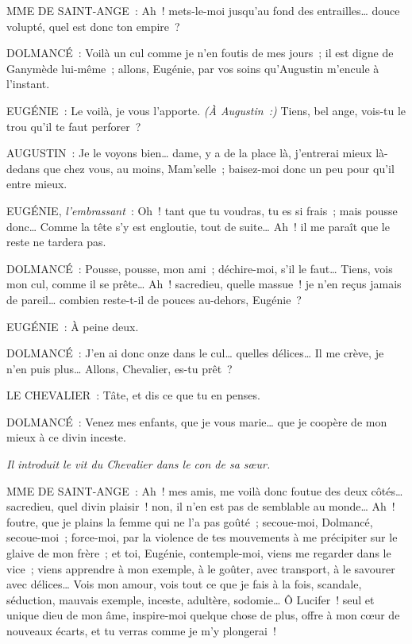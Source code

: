 \documentclass[french,twoside]{book} %
\begin{document}
MME DE SAINT-ANGE : Ah ! mets-le-moi jusqu’au fond des entrailles… douce volupté, quel est donc ton empire ?\par
DOLMANCÉ : Voilà un cul comme je n’en foutis de mes jours ; il est digne de Ganymède lui-même ; allons, Eugénie, par vos soins qu’Augustin m’encule à l’instant.\par
EUGÉNIE : Le voilà, je vous l’apporte. {\itshape (À Augustin :)} Tiens, bel ange, vois-tu le trou qu’il te faut perforer ?\par
AUGUSTIN : Je le voyons bien… dame, y a de la place là, j’entrerai mieux là-dedans que chez vous, au moins, Mam’selle ; baisez-moi donc un peu pour qu’il entre mieux.\par
EUGÉNIE, {\itshape l’embrassant} : Oh ! tant que tu voudras, tu es si frais ; mais pousse donc… Comme la tête s’y est engloutie, tout de suite… Ah ! il me paraît que le reste ne tardera pas.\par
DOLMANCÉ : Pousse, pousse, mon ami ; déchire-moi, s’il le faut… Tiens, vois mon cul, comme il se prête… Ah ! sacredieu, quelle massue ! je n’en reçus jamais de pareil… combien reste-t-il de pouces au-dehors, Eugénie ?\par
EUGÉNIE : À peine deux.\par
DOLMANCÉ : J’en ai donc onze dans le cul… quelles délices… Il me crève, je n’en puis plus… Allons, Chevalier, es-tu prêt ?\par
LE CHEVALIER : Tâte, et dis ce que tu en penses.\par
DOLMANCÉ : Venez mes enfants, que je vous marie… que je coopère de mon mieux à ce divin inceste.\par
{\itshape Il introduit le vit du Chevalier dans le con de sa sœur.}\par
MME DE SAINT-ANGE : Ah ! mes amis, me voilà donc foutue des deux côtés… sacredieu, quel divin plaisir ! non, il n’en est pas de semblable au monde… Ah ! foutre, que je plains la femme qui ne l’a pas goûté ; secoue-moi, Dolmancé, secoue-moi ; force-moi, par la violence de tes mouvements à me précipiter sur le glaive de mon frère ; et toi, Eugénie, contemple-moi, viens me regarder dans le vice ; viens apprendre à mon exemple, à le goûter, avec transport, à le savourer avec délices… Vois mon amour, vois tout ce que je fais à la fois, scandale, séduction, mauvais exemple, inceste, adultère, sodomie… Ô Lucifer ! seul et unique dieu de mon âme, inspire-moi quelque chose de plus, offre à mon cœur de nouveaux écarts, et tu verras comme je m’y plongerai !\par
\end{document}
